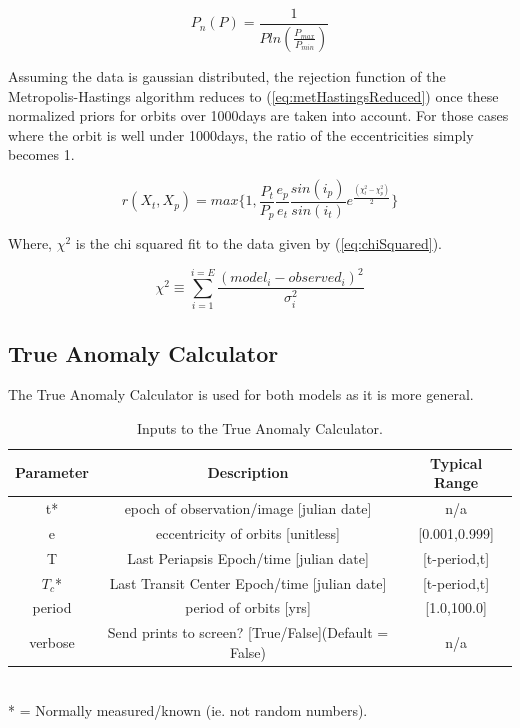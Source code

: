 \documentclass[10pt,preprint]{aastex}
\begin{document}
\begin{equation}\label{eq:pProb}
P_n(P) =  \frac{1}{P ln(\frac{P_{max}}{P_{min}})}
\end{equation}

Assuming the data is gaussian distributed, the rejection function of the Metropolis-Hastings algorithm reduces to (\ref{eq:metHastingsReduced}) once these normalized priors for orbits over 1000days are taken into account.  For those cases where the orbit is well under 1000days, the ratio of the eccentricities simply becomes 1.

\begin{equation}\label{eq:metHastingsReduced}
r(X_t,X_p) = max\bigg\{1, \frac{P_t}{P_p}\frac{e_p}{e_t}\frac{sin(i_p)}{sin(i_t)}e^{\frac{(\chi^2_t - \chi^2_p)}{2}} \bigg\}
\end{equation}

Where, $\chi^2$ is the chi squared fit to the data given by (\ref{eq:chiSquared}).

\begin{equation}\label{eq:chiSquared}
{\chi}^{2} \equiv  \sum_{i=1}^{i=E} \frac{(model_i - observed_i)^{2}}{\sigma^{2}_i}
\end{equation}

\pagebreak
\subsection{True Anomaly Calculator}
The True Anomaly Calculator is used for both models as it is more general.

\begin{table}[h]
\centering
\caption{ Inputs to the True Anomaly Calculator.}
\begin{tabular}{c c c}
\hline\hline
Parameter & Description & Typical Range \\
\hline
t* & epoch of observation/image [julian date] & n/a\\
e & eccentricity of orbits [unitless] & [0.001,0.999]\\
T & Last Periapsis Epoch/time [julian date] & [t-period,t]\\
$T_c$* & Last Transit Center Epoch/time [julian date] & [t-period,t]\\
period & period of orbits [yrs] & [1.0,100.0]\\
verbose & Send prints to screen? [True/False](Default = False) & n/a\\
\hline
\end{tabular}
\\
 * = Normally measured/known (ie. not random numbers).
\end{table}
\end{document}
